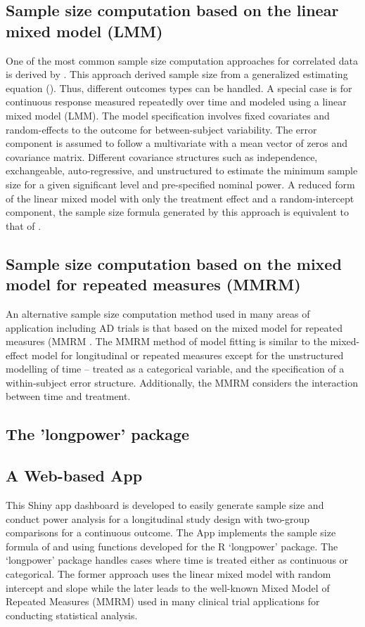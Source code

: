 \documentclass[oupdraft]{bio}
\begin{document}
\subsection{Sample size computation based on the linear mixed model (LMM)}
\label{model}
One of the most common sample size computation approaches for correlated data is derived by \cite{Liu_Liang(1997)}. This approach derived sample size from a generalized estimating equation (\cite{Liang_Zeger(1986)}). Thus, different outcomes types can be handled. A special case is for continuous response measured repeatedly over time and modeled using a linear mixed model (LMM). The model specification involves fixed covariates and random-effects to the outcome for between-subject variability. The error component is assumed to follow a multivariate with a mean vector of zeros and covariance matrix. Different covariance structures such as independence, exchangeable, auto-regressive, and unstructured to estimate the minimum sample size for a given significant level and pre-specified nominal power. A reduced form of the linear mixed model with only the treatment effect and a random-intercept component, the sample size formula generated by this approach is equivalent to that of \cite{Diggle_Liang_Zeger(1994)}. 

\subsection{Sample size computation based on the mixed model for repeated measures (MMRM)}
\label{model2}
An alternative sample size computation method used in many areas of application including AD trials is that based on the mixed model for repeated measures (MMRM \cite{Mallinckrodt_etal(2001),Mallinckrodt_etal(2003),Lane(2008)}. The MMRM method of model fitting is similar to the mixed-effect model for longitudinal or repeated measures except for the unstructured modelling of time – treated as a categorical variable, and the specification of a within-subject error structure. Additionally, the MMRM considers the interaction between time and treatment. 

\subsection{The 'longpower' package}
\label{model3}

\subsection{A Web-based App}
\label{model4}
This Shiny app dashboard is developed to easily generate sample size and conduct power analysis for a longitudinal study design with two-group comparisons for a continuous outcome. The App implements the sample size formula of \cite{Liu_Liang(1997)} and \cite{Diggle_etal(1994)} using functions developed for the R `longpower' package. The `longpower' package handles cases where time is treated either as continuous or categorical. The former approach uses the linear mixed model with random intercept and slope while the later leads to the well-known Mixed Model of Repeated Measures (MMRM) used in many clinical trial applications for conducting statistical analysis. 
\end{document}

